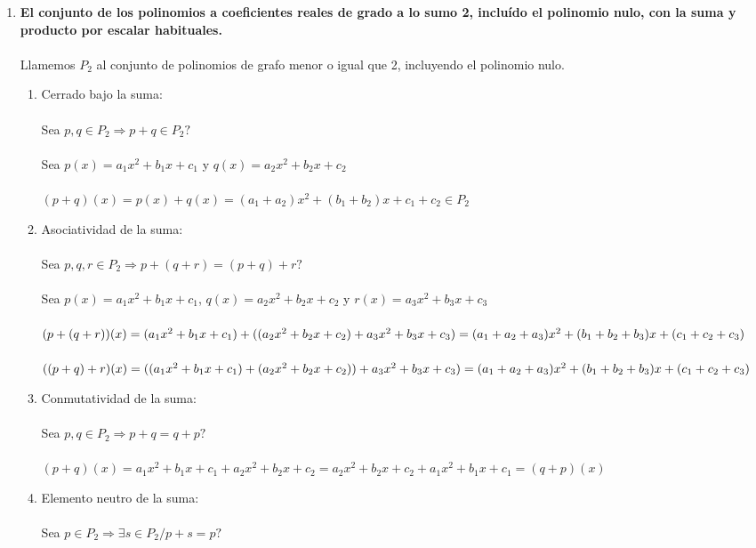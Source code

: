 \documentclass{article}
\begin{document}
\begin{enumerate}[1.]
\item \textbf{El conjunto de los polinomios a coeficientes reales de grado a lo sumo 2, incluído el polinomio
nulo, con la suma y producto por escalar habituales.} \\ \\
Llamemos $P_2$ al conjunto de polinomios de grafo menor o igual que 2, incluyendo el polinomio nulo. \\
\begin{enumerate}[(1)]
\item
	Cerrado bajo la suma: \\ \\
	Sea $p,q \in P_2 \Rightarrow p+q \in P_2?$ \\ \\
	Sea $p(x) = a_1x^2 + b_1x +c_1$ y $q(x) = a_2x^2 + b_2x + c_2$ \\ \\
	$(p+q)(x) = p(x) + q(x) = (a_1 + a_2)x^2 + (b_1 + b_2)x + c_1 + c_2\in P_2$
\item
	Asociatividad de la suma: \\ \\
	Sea $p,q,r \in P_2 \Rightarrow p+(q+r) = (p+q)+r?$ \\ \\
	Sea $p(x) = a_1x^2 + b_1x +c_1$, $q(x) = a_2x^2 + b_2x + c_2$ y $r(x) = a_3x^2 + b_3x + c_3$ \\ \\
	$(p+(q+r))(x) = (a_1x^2 + b_1x +c_1) + ((a_2x^2 + b_2x + c_2) + a_3x^2 + b_3x + c_3) = 
	(a_1 + a_2 + a_3)x^2 + \\ (b_1 + b_2 + b_3) x + (c_1 + c_2 + c_3) $ \\ \\
	$((p+q)+r)(x) = ((a_1x^2 + b_1x +c_1) + (a_2x^2 + b_2x + c_2)) + a_3x^2 + b_3x + c_3) = 
	(a_1 + a_2 + a_3)x^2 + \\ (b_1 + b_2 + b_3) x + (c_1 + c_2 + c_3) $
\item
	Conmutatividad de la suma: \\ \\
	Sea $p,q \in P_2 \Rightarrow p+q = q+p?$ \\ \\
	$(p+q)(x) = a_1x^2 + b_1x + c_1 + a_2x^2 + b_2x + c_2 = a_2x^2 + b_2x + c_2 + a_1x^2 + b_1x + c_1 = (q+p)(x)$
\item
	Elemento neutro de la suma: \\ \\
	Sea $p \in P_2 \Rightarrow \exists s \in P_2 / p+s = p?$ \\ \\

\end{enumerate}
\end{enumerate}
\end{document}
